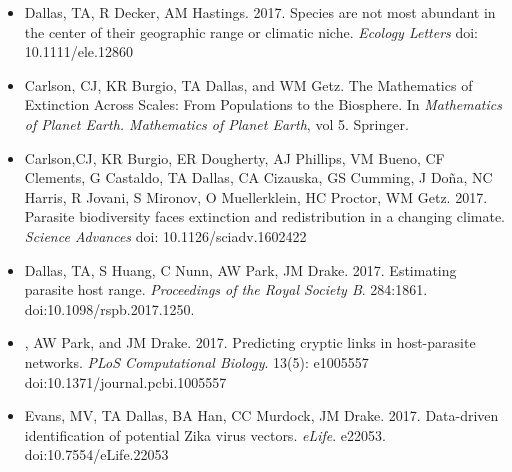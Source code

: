 \documentclass[]{CV}
\begin{document}
{}
\begin{itemize}

\item {\mefont Dallas, TA}, R Decker, AM Hastings. 2017. Species are not most abundant in the center of their geographic range or climatic niche. \textit{Ecology Letters} doi: 10.1111/ele.12860

\item Carlson, CJ, KR Burgio, {\mefont TA Dallas}, and WM Getz. The Mathematics of Extinction Across Scales: From Populations to the Biosphere. In \textit{Mathematics of Planet Earth. Mathematics of Planet Earth}, vol 5. Springer. 


\item \OA Carlson,CJ, KR Burgio, ER Dougherty, AJ Phillips, VM Bueno, CF Clements, G Castaldo, {\mefont TA Dallas}, CA Cizauska, GS Cumming, J Do\~na, NC Harris, R Jovani, S Mironov, O Muellerklein, HC Proctor, WM Getz. 2017. Parasite biodiversity faces extinction and redistribution in a changing climate. \textit{Science Advances} doi: 10.1126/sciadv.1602422

\item {\mefont Dallas, TA}, S Huang, C Nunn, AW Park, JM Drake. 2017. Estimating parasite host range. \textit{Proceedings of the Royal Society B}. 284:1861. doi:10.1098/rspb.2017.1250.

\item {}, AW Park, and JM Drake. 2017. Predicting cryptic links in host-parasite networks. \textit{PLoS Computational Biology}. 13(5): e1005557 doi:10.1371/journal.pcbi.1005557

\item \OA Evans, MV, {\mefont TA Dallas}, BA Han, CC Murdock, JM Drake. 2017. Data-driven identification of potential Zika virus vectors. \textit{eLife}. e22053. doi:10.7554/eLife.22053

\end{itemize}
\end{document}
